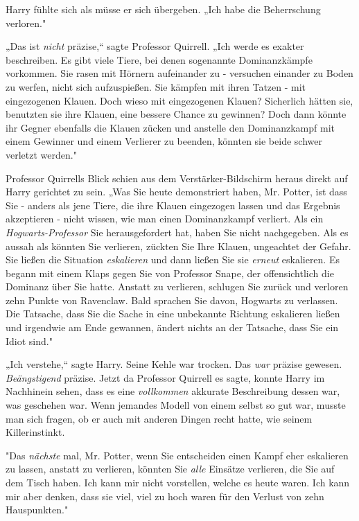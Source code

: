 {Harry fühlte sich als müsse er sich übergeben. „Ich habe die Beherrschung verloren."

„Das ist \emph{nicht} präzise,“ sagte Professor Quirrell. „Ich werde es exakter beschreiben. Es gibt viele Tiere, bei denen sogenannte Dominanzkämpfe vorkommen. Sie rasen mit Hörnern aufeinander zu - versuchen einander zu Boden zu werfen, nicht sich aufzuspießen. Sie kämpfen mit ihren Tatzen - mit eingezogenen Klauen. Doch wieso mit eingezogenen Klauen? Sicherlich hätten sie, benutzten sie ihre Klauen, eine bessere Chance zu gewinnen? Doch dann könnte ihr Gegner ebenfalls die Klauen zücken und anstelle den Dominanzkampf mit einem Gewinner und einem Verlierer zu beenden, könnten sie beide schwer verletzt werden."

Professor Quirrells Blick schien aus dem Verstärker-Bildschirm heraus direkt auf Harry gerichtet zu sein. „Was Sie heute demonstriert haben, Mr. Potter, ist dass Sie - anders als jene Tiere, die ihre Klauen eingezogen lassen und das Ergebnis akzeptieren - nicht wissen, wie man einen Dominanzkampf verliert. Als ein \emph{Hogwarts-Professor} Sie herausgefordert hat, haben Sie nicht nachgegeben. Als es aussah als könnten Sie verlieren, zückten Sie Ihre Klauen, ungeachtet der Gefahr. Sie ließen die Situation \emph{eskalieren} und dann ließen Sie sie \emph{erneut} eskalieren. Es begann mit einem Klaps gegen Sie von Professor Snape, der offensichtlich die Dominanz über Sie hatte. Anstatt zu verlieren, schlugen Sie zurück und verloren zehn Punkte von Ravenclaw. Bald sprachen Sie davon, Hogwarts zu verlassen. Die Tatsache, dass Sie die Sache in eine unbekannte Richtung eskalieren ließen und irgendwie am Ende gewannen, ändert nichts an der Tatsache, dass Sie ein Idiot sind."

„Ich verstehe,“ sagte Harry. Seine Kehle war trocken. Das \emph{war} präzise gewesen. \emph{Beängstigend} präzise. Jetzt da Professor Quirrell es sagte, konnte Harry im Nachhinein sehen, dass es eine \emph{vollkommen} akkurate Beschreibung dessen war, was geschehen war. Wenn jemandes Modell von einem selbst so gut war, musste man sich fragen, ob er auch mit anderen Dingen recht hatte, wie seinem Killerinstinkt.

"Das \emph{nächste} mal, Mr. Potter, wenn Sie entscheiden einen Kampf eher eskalieren zu lassen, anstatt zu verlieren, könnten Sie \emph{alle} Einsätze verlieren, die Sie auf dem Tisch haben. Ich kann mir nicht vorstellen, welche es heute waren. Ich kann mir aber denken, dass sie viel, viel zu hoch waren für den Verlust von zehn Hauspunkten."

}
